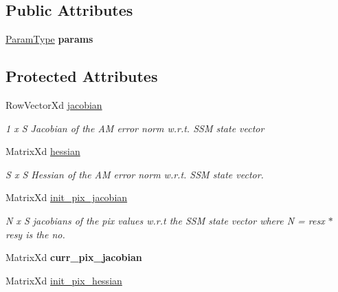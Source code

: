 \subsection*{Public Attributes}
\begin{DoxyCompactItemize}
\item 
\hypertarget{classIALK_a8b7e25577fed0a548f13637dbf9bb016}{\hyperlink{structIALKParams}{Param\-Type} {\bfseries params}}\label{classIALK_a8b7e25577fed0a548f13637dbf9bb016}

\end{DoxyCompactItemize}
\subsection*{Protected Attributes}
\begin{DoxyCompactItemize}
\item 
\hypertarget{classIALK_a088b47de1bfc774d06ed471f3c49e246}{Row\-Vector\-Xd \hyperlink{classIALK_a088b47de1bfc774d06ed471f3c49e246}{jacobian}}\label{classIALK_a088b47de1bfc774d06ed471f3c49e246}

\begin{DoxyCompactList}\small\item\em 1 x S Jacobian of the A\-M error norm w.\-r.\-t. S\-S\-M state vector \end{DoxyCompactList}\item 
\hypertarget{classIALK_a2a9adc8908a42e6ef3ae9a4e3bc80840}{Matrix\-Xd \hyperlink{classIALK_a2a9adc8908a42e6ef3ae9a4e3bc80840}{hessian}}\label{classIALK_a2a9adc8908a42e6ef3ae9a4e3bc80840}

\begin{DoxyCompactList}\small\item\em S x S Hessian of the A\-M error norm w.\-r.\-t. S\-S\-M state vector. \end{DoxyCompactList}\item 
Matrix\-Xd \hyperlink{classIALK_a56a3ab9d611d6f87029491b5d9da8a7d}{init\-\_\-pix\-\_\-jacobian}
\begin{DoxyCompactList}\small\item\em N x S jacobians of the pix values w.\-r.\-t the S\-S\-M state vector where N = resx $\ast$ resy is the no. \end{DoxyCompactList}\item 
\hypertarget{classIALK_a2c635c3e6b8963345921317dd0a35e73}{Matrix\-Xd {\bfseries curr\-\_\-pix\-\_\-jacobian}}\label{classIALK_a2c635c3e6b8963345921317dd0a35e73}

\item 
\hypertarget{classIALK_a6a0d1395726fca89e7146c821bcb5967}{Matrix\-Xd \hyperlink{classIALK_a6a0d1395726fca89e7146c821bcb5967}{init\-\_\-pix\-\_\-hessian}}\label{classIALK_a6a0d1395726fca89e7146c821bcb5967}


\end{DoxyCompactItemize}
